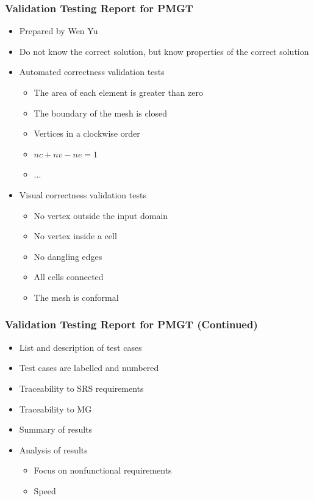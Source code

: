\documentclass[t,12pt,numbers,fleqn]{beamer}
\begin{document}
\begin{frame}
\frametitle{Validation Testing Report for PMGT}
\begin{itemize}
\item Prepared by Wen Yu
\item Do not know the correct solution, but know properties of the correct solution
\item Automated correctness validation tests
\begin{itemize}
\item The area of each element is greater than zero
\item The boundary of the mesh is closed
\item Vertices in a clockwise order
\item $nc + nv - ne = 1$
\item ...
\end{itemize}
\item Visual correctness validation tests
\begin{itemize}
\item No vertex outside the input domain
\item No vertex inside a cell
\item No dangling edges
\item All cells connected
\item  The mesh is conformal
\end{itemize}
\end{itemize}
\end{frame}


\begin{frame}
\frametitle{Validation Testing Report for PMGT (Continued)}
\begin{itemize}
\item List and description of test cases
\item Test cases are labelled and numbered
\item Traceability to SRS requirements
\item Traceability to MG
\item Summary of results
\item Analysis of results
\begin{itemize}
\item Focus on nonfunctional requirements
\item Speed
\end{itemize}
\end{itemize}
\end{frame}
\end{document}
